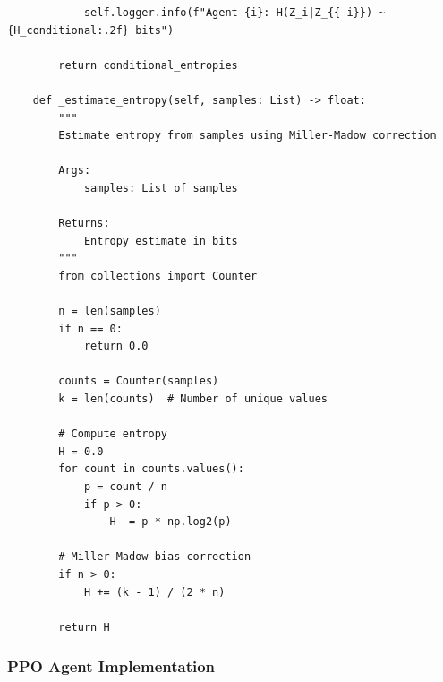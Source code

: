 \documentclass[10pt, letterpaper]{article}
\begin{document}
\begin{lstlisting}
            self.logger.info(f"Agent {i}: H(Z_i|Z_{{-i}}) ~ {H_conditional:.2f} bits")

        return conditional_entropies

    def _estimate_entropy(self, samples: List) -> float:
        """
        Estimate entropy from samples using Miller-Madow correction

        Args:
            samples: List of samples

        Returns:
            Entropy estimate in bits
        """
        from collections import Counter

        n = len(samples)
        if n == 0:
            return 0.0

        counts = Counter(samples)
        k = len(counts)  # Number of unique values

        # Compute entropy
        H = 0.0
        for count in counts.values():
            p = count / n
            if p > 0:
                H -= p * np.log2(p)

        # Miller-Madow bias correction
        if n > 0:
            H += (k - 1) / (2 * n)

        return H
\end{lstlisting}

\subsubsection{PPO Agent Implementation}
\end{document}
